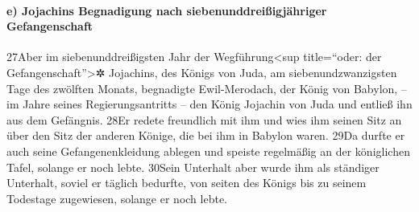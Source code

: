 \hypertarget{e-jojachins-begnadigung-nach-siebenunddreiuxdfigjuxe4hriger-gefangenschaft}{%
\paragraph{e) Jojachins Begnadigung nach siebenunddreißigjähriger
Gefangenschaft}\label{e-jojachins-begnadigung-nach-siebenunddreiuxdfigjuxe4hriger-gefangenschaft}}

27Aber im siebenunddreißigsten Jahr der Wegführung\textless sup
title=``oder: der Gefangenschaft''\textgreater✲ Jojachins, des Königs
von Juda, am siebenundzwanzigsten Tage des zwölften Monats, begnadigte
Ewil-Merodach, der König von Babylon, -- im Jahre seines
Regierungsantritts -- den König Jojachin von Juda und entließ ihn aus
dem Gefängnis. 28Er redete freundlich mit ihm und wies ihm seinen Sitz
an über den Sitz der anderen Könige, die bei ihm in Babylon waren. 29Da
durfte er auch seine Gefangenenkleidung ablegen und speiste regelmäßig
an der königlichen Tafel, solange er noch lebte. 30Sein Unterhalt aber
wurde ihm als ständiger Unterhalt, soviel er täglich bedurfte, von
seiten des Königs bis zu seinem Todestage zugewiesen, solange er noch
lebte.

